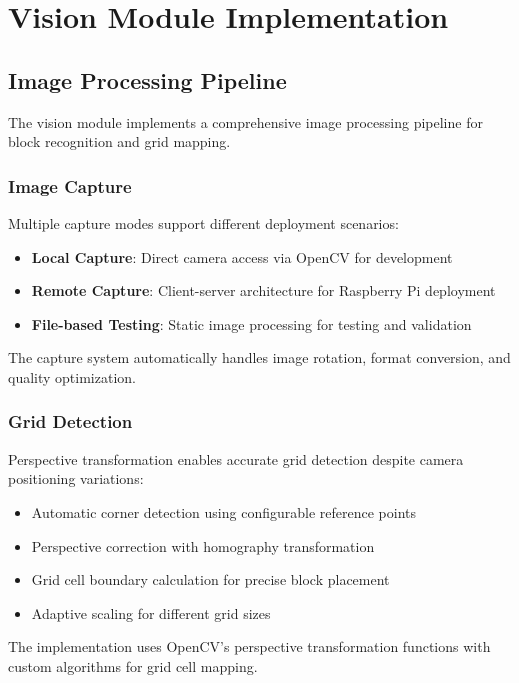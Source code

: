 \section{Vision Module Implementation}

\subsection{Image Processing Pipeline}

The vision module implements a comprehensive image processing pipeline for block recognition and grid mapping.

\subsubsection{Image Capture}

Multiple capture modes support different deployment scenarios:

\begin{itemize}
    \item \textbf{Local Capture}: Direct camera access via OpenCV for development
    \item \textbf{Remote Capture}: Client-server architecture for Raspberry Pi deployment
    \item \textbf{File-based Testing}: Static image processing for testing and validation
\end{itemize}

The capture system automatically handles image rotation, format conversion, and quality optimization.

\subsubsection{Grid Detection}

Perspective transformation enables accurate grid detection despite camera positioning variations:

\begin{itemize}
    \item Automatic corner detection using configurable reference points
    \item Perspective correction with homography transformation
    \item Grid cell boundary calculation for precise block placement
    \item Adaptive scaling for different grid sizes
\end{itemize}

The implementation uses OpenCV's perspective transformation functions with custom algorithms for grid cell mapping.

